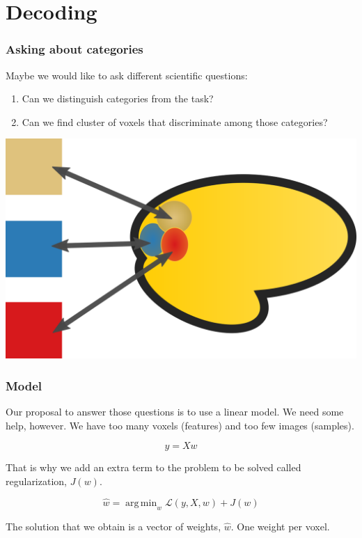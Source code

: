 \documentclass[11pt]{beamer}
\DeclareMathOperator*{\argmin}{arg\,min}
\begin{document}
\section{Decoding}
\label{sec:Decoding}

\begin{frame}
    \frametitle{Asking about categories}

    Maybe we would like to ask different scientific questions:
    \begin{enumerate}
        \item Can we distinguish categories from the task?
        \item Can we find cluster of voxels that discriminate among those categories?
    \end{enumerate}

    \begin{center}
        \includegraphics[scale=0.2]{figures/decoding.png}
    \end{center}

\end{frame}

\begin{frame}
    \frametitle{Model}
    Our proposal to answer those questions is to use a linear model. We need
    some help, however. We have too many voxels (features) and too few images
    (samples). 

    \[y = Xw\]

    That is why we add an extra term to the problem to be solved called
    regularization, $J(w)$.

    \[\hat{w} = \argmin_{w} \mathcal{L}\left(y, X, w \right) + J(w) \]

    The solution that we obtain is a vector of weights, $\hat{w}$. One weight
    per voxel.
\end{frame}
\end{document}
